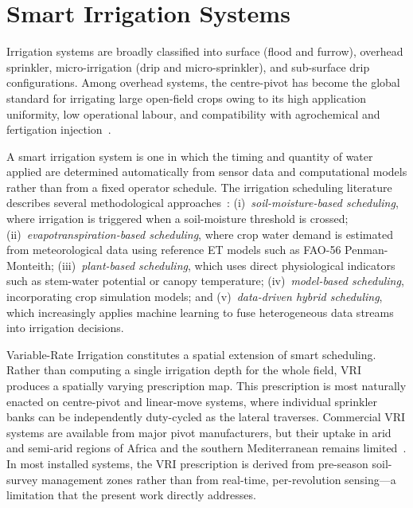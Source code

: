 \documentclass[12pt,a4paper]{report}
\begin{document}
\section{Smart Irrigation Systems}

Irrigation systems are broadly classified into surface (flood and furrow), overhead sprinkler, micro-irrigation (drip and micro-sprinkler), and sub-surface drip configurations. Among overhead systems, the centre-pivot has become the global standard for irrigating large open-field crops owing to its high application uniformity, low operational labour, and compatibility with agrochemical and fertigation injection~\cite{Evans2012}.

A smart irrigation system is one in which the timing and quantity of water applied are determined automatically from sensor data and computational models rather than from a fixed operator schedule. The irrigation scheduling literature describes several methodological approaches~\cite{Tzounis2017}: (i)~\emph{soil-moisture-based scheduling}, where irrigation is triggered when a soil-moisture threshold is crossed; (ii)~\emph{evapotranspiration-based scheduling}, where crop water demand is estimated from meteorological data using reference ET models such as FAO-56 Penman-Monteith; (iii)~\emph{plant-based scheduling}, which uses direct physiological indicators such as stem-water potential or canopy temperature; (iv)~\emph{model-based scheduling}, incorporating crop simulation models; and (v)~\emph{data-driven hybrid scheduling}, which increasingly applies machine learning to fuse heterogeneous data streams into irrigation decisions.

Variable-Rate Irrigation constitutes a spatial extension of smart scheduling. Rather than computing a single irrigation depth for the whole field, VRI produces a spatially varying prescription map. This prescription is most naturally enacted on centre-pivot and linear-move systems, where individual sprinkler banks can be independently duty-cycled as the lateral traverses. Commercial VRI systems are available from major pivot manufacturers, but their uptake in arid and semi-arid regions of Africa and the southern Mediterranean remains limited~\cite{Evans2012}. In most installed systems, the VRI prescription is derived from pre-season soil-survey management zones rather than from real-time, per-revolution sensing---a limitation that the present work directly addresses.

\end{document}
